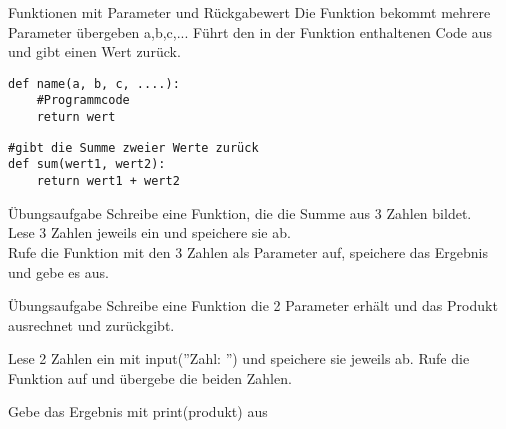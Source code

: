 \begin{frame}[fragile]{Funktionen mit Parameter und Rückgabewert}
Die Funktion bekommt mehrere Parameter übergeben a,b,c,... 
Führt den in der Funktion enthaltenen Code aus und gibt einen Wert zurück.
\begin{lstlisting}
def name(a, b, c, ....):
	#Programmcode
	return wert
\end{lstlisting}

\begin{lstlisting}
#gibt die Summe zweier Werte zurück
def sum(wert1, wert2):
	return wert1 + wert2	
\end{lstlisting}
\end{frame}

\begin{frame}[fragile]{Übungsaufgabe}
Schreibe eine Funktion, die die Summe aus 3 Zahlen bildet.\\
Lese 3 Zahlen jeweils ein und speichere sie ab.\\
Rufe die Funktion mit den 3 Zahlen als Parameter auf, speichere das Ergebnis und gebe es aus.

\end{frame}


\begin{frame}[fragile]{Übungsaufgabe}
Schreibe eine Funktion die 2 Parameter erhält und das Produkt ausrechnet und zurückgibt.

Lese 2 Zahlen ein mit input(''Zahl: '') und speichere sie jeweils ab. Rufe die Funktion auf und übergebe die beiden Zahlen.

Gebe das Ergebnis mit print(produkt) aus


\end{frame}







